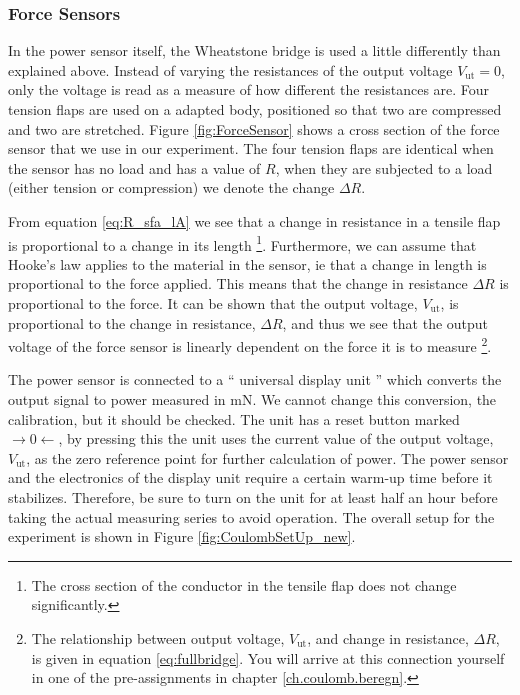 \documentclass[../Elmag-labhefte-2022.tex]{subfiles}
\begin{document}
\subsubsection{Force Sensors} \vspace{-5mm}
In the power sensor itself, the Wheatstone bridge is used a little differently than explained above. Instead of varying the resistances of the output voltage $V_\text{ut} = 0$, only the voltage is read as a measure of how different the resistances are. Four tension flaps are used on a adapted body, positioned so that two are compressed and two are stretched. Figure \ref{fig:ForceSensor} shows a cross section of the force sensor that we use in our experiment. The four tension flaps are identical when the sensor has no load and has a value of $R$, when they are subjected to a load (either tension or compression) we denote the change ${\Delta R}$.

From equation \eqref{eq:R_sfa_lA} we see that a change in resistance in a tensile flap is proportional to a change in its length \footnote{The cross section of the conductor in the tensile flap does not change significantly.}. Furthermore, we can assume that Hooke's law applies to the material in the sensor, ie that a change in length is proportional to the force applied. This means that the change in resistance $\Delta R$ is proportional to the force. It can be shown that the output voltage, $V_\text{ut}$, is proportional to the change in resistance, $\Delta R$, and thus we see that the output voltage of the force sensor is linearly dependent on the force it is to measure \footnote{The relationship between output voltage, $V_\text{ut}$, and change in resistance, $\Delta R$, is given in equation \eqref{eq:fullbridge}. You will arrive at this connection yourself in one of the pre-assignments in chapter \ref{ch.coulomb.beregn}.}.

The power sensor is connected to a `` universal display unit '' which converts the output signal to power measured in \si{\milli\newton}. We cannot change this conversion, the calibration, but it should be checked. The unit has a reset button marked $\rightarrow 0 \leftarrow$, by pressing this the unit uses the current value of the output voltage, $V_\text{ut}$, as the zero reference point for further calculation of power. The power sensor and the electronics of the display unit require a certain warm-up time before it stabilizes. Therefore, be sure to turn on the unit for at least half an hour before taking the actual measuring series to avoid operation. The overall setup for the experiment is shown in Figure \ref{fig:CoulombSetUp_new}.
\end{document}
